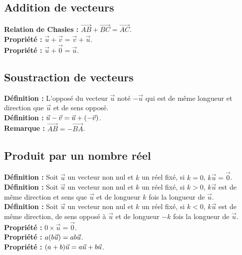 \documentclass[a4paper,titlepage]{article}
\let\oldleft\left
\renewcommand{\left}{\mathopen{}\mathclose\bgroup\oldleft}
\let\oldright\right
\renewcommand{\right}{\aftergroup\egroup\oldright}
\begin{document}
    \subsection{Addition de vecteurs}
        \textbf{Relation de Chasles :} $\overrightarrow{AB}+\overrightarrow{BC}=\overrightarrow{AC}$.
        \\
        \textbf{Propriété :} $\vec{u}+\vec{v}=\vec{v}+\vec{u}$.
        \\
        \textbf{Propriété :} $\vec{u}+\overrightarrow{0}=\vec{u}$.
    \subsection{Soustraction de vecteurs}
        \textbf{Définition :} L’opposé du vecteur $\vec{u}$ noté $-\vec{u}$ qui est de même longueur et direction que $\vec{u}$ et de sens opposé.
        \\
        \textbf{Définition :} $\vec{u}-\vec{v}=\vec{u}+\left(-\vec{v}\right)$.
        \\
        \textbf{Remarque :} $\overrightarrow{AB}=-\overrightarrow{BA}$.
    \subsection{Produit par un nombre réel}
        \textbf{Définition :} Soit $\vec{u}$ un vecteur non nul et $k$ un réel fixé, si $k=0$, $k\vec{u}=\overrightarrow{0}$.
        \\
        \textbf{Définition :} Soit $\vec{u}$ un vecteur non nul et $k$ un réel fixé, si $k>0$, $k\vec{u}$ est de même direction et sens que $\vec{u}$ et de longueur $k$ fois la longueur de $\vec{u}$.
        \\
        \textbf{Définition :} Soit $\vec{u}$ un vecteur non nul et $k$ un réel fixé, si $k<0$, $k\vec{u}$ est de même direction, de sens opposé à $\vec{u}$ et de longueur $-k$ fois la longueur de $\vec{u}$.
        \\
        \textbf{Propriété :} $0\times\vec{u}=\overrightarrow{0}$.
        \\
        \textbf{Propriété :} $a\left(b\vec{u}\right)=ab\vec{u}$.
        \\
        \textbf{Propriété :} $\left(a+b\right)\vec{u}=a\vec{u}+b\vec{u}$.
\end{document}
